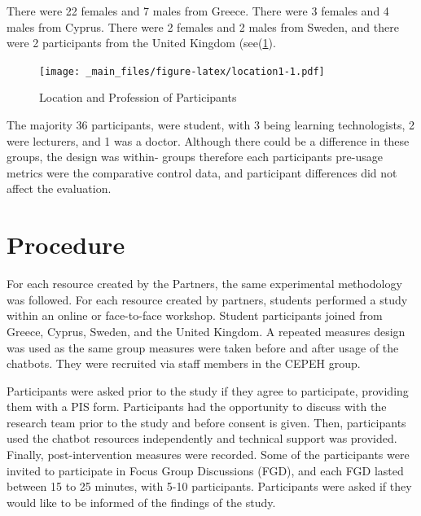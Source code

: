 \documentclass[a4paper, nobind]{templates/ociamthesis}
\begin{document}
There were 22 females and 7 males from Greece.
There were 3 females and 4 males from Cyprus.
There were 2 females and 2 males from Sweden,
and there were 2 participants from the United Kingdom (see(\ref{fig:location1}).

\begin{figure}
\centering
\texttt{[image: \_main\_files/figure-latex/location1-1.pdf]}
\caption{\label{fig:location1}Location and Profession of Participants}
\end{figure}

The majority 36 participants, were student, with 3 being learning technologists, 2 were lecturers, and 1 was a doctor.
Although there could be a difference in these groups, the design was within- groups therefore each participants pre-usage metrics were the comparative control data, and participant differences did not affect the evaluation.

\hypertarget{procedure}{%
\section{Procedure}\label{procedure}}

For each resource created by the Partners, the same experimental methodology was followed. For each resource created by partners, students performed a study within an online or face-to-face workshop. Student participants joined from Greece, Cyprus, Sweden, and the United Kingdom. A repeated measures design was used as the same group measures were taken before and after usage of the chatbots. They were recruited via staﬀ members in the CEPEH group.

Participants were asked prior to the study if they agree to participate, providing them with a PIS form. Participants had the opportunity to discuss with the research team prior to the study and before consent is given. Then, participants used the chatbot resources independently and technical support was provided. Finally, post-intervention measures were recorded. Some of the participants were invited to participate in Focus Group Discussions (FGD), and each FGD lasted between 15 to 25 minutes, with 5-10 participants. Participants were asked if they would like to be informed of the ﬁndings of the study.
\end{document}
